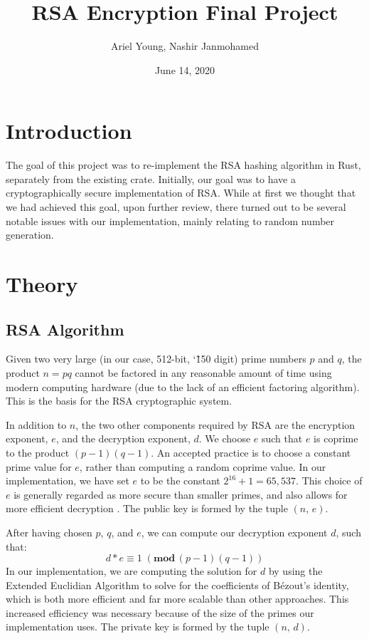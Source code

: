 \documentclass{article}
\title{RSA Encryption Final Project}
\author{Ariel Young, Nashir Janmohamed}
\date{June 14, 2020}
\begin{document}
\maketitle
\tableofcontents

\section{Introduction}
The goal of this project was to re-implement the RSA hashing algorithm in Rust, separately from the existing crate. Initially, our goal was to have a cryptographically secure implementation of RSA. While at first we thought that we had achieved this goal, upon further review, there turned out to be several notable issues with our implementation, mainly relating to random number generation.

\section{Theory}
\subsection{RSA Algorithm}
Given two very large (in our case, 512-bit, \char`\~ 150 digit) prime numbers $p$ and $q$, the product $n = pq$ cannot be factored in any reasonable amount of time using modern computing hardware (due to the lack of an efficient factoring algorithm). This is the basis for the RSA cryptographic system. 

In addition to $n$, the two other components required by RSA are the encryption exponent, $e$, and the decryption exponent, $d$. We choose $e$ such that $e$ is coprime to the product $(p - 1)(q - 1)$. An accepted practice is to choose a constant prime value for $e$, rather than computing a random coprime value. In our implementation, we have set $e$ to be the constant $2^{16} + 1 = 65,537$. This choice of $e$ is generally regarded as more secure than smaller primes, and also allows for more efficient decryption \cite{rsa_attacks}. The public key is formed by the tuple $(n,\, e)$.

After having chosen $p$, $q$, and $e$, we can compute our decryption exponent $d$, such that: \[ d*e \equiv 1 \;(\textbf{mod}\,(p - 1)(q - 1)) \] In our implementation, we are computing the solution for $d$ by using the Extended Euclidian Algorithm to solve for the coefficients of Bézout's identity, which is both more efficient and far more scalable than other approaches. This increased efficiency was necessary because of the size of the primes our implementation uses. The private key is formed by the tuple $(n,\, d)$.
\end{document}
